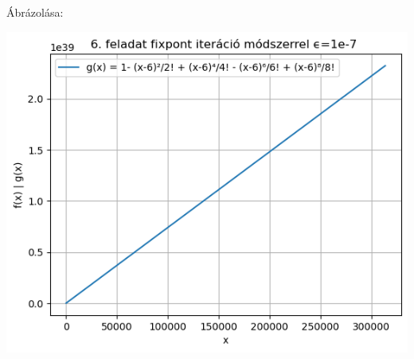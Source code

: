 \documentclass{article}
\begin{document}
Ábrázolása: 

\includegraphics[scale=1]{../plot_8.png}  
 
\end{document}
